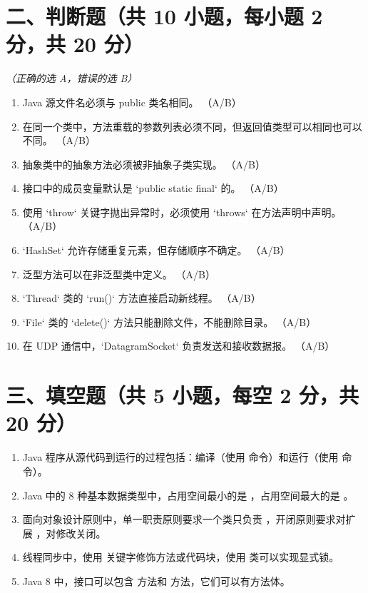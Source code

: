 \documentclass[a3paper, landscape, 11pt, twocolumn]{article}
\newcommand{\blank}{\underline{\hspace{2cm}}}
\begin{document}
\section*{二、判断题（共 10 小题，每小题 2 分，共 20 分）}
\textit{（正确的选 A，错误的选 B）}

\begin{enumerate}[label=\arabic*., itemsep=0.6em]
	\item Java 源文件名必须与 public 类名相同。 \underline{\hspace{1cm}}（A/B）
	\item 在同一个类中，方法重载的参数列表必须不同，但返回值类型可以相同也可以不同。 \underline{\hspace{1cm}}（A/B）
	\item 抽象类中的抽象方法必须被非抽象子类实现。 \underline{\hspace{1cm}}（A/B）
	\item 接口中的成员变量默认是 `public static final` 的。 \underline{\hspace{1cm}}（A/B）
	\item 使用 `throw` 关键字抛出异常时，必须使用 `throws` 在方法声明中声明。 \underline{\hspace{1cm}}（A/B）
	\item `HashSet` 允许存储重复元素，但存储顺序不确定。 \underline{\hspace{1cm}}（A/B）
	\item 泛型方法可以在非泛型类中定义。 \underline{\hspace{1cm}}（A/B）
	\item `Thread` 类的 `run()` 方法直接启动新线程。 \underline{\hspace{1cm}}（A/B）
	\item `File` 类的 `delete()` 方法只能删除文件，不能删除目录。 \underline{\hspace{1cm}}（A/B）
	\item 在 UDP 通信中，`DatagramSocket` 负责发送和接收数据报。 \underline{\hspace{1cm}}（A/B）
\end{enumerate}

\section*{三、填空题（共 5 小题，每空 2 分，共 20 分）}

\begin{enumerate}[label=\arabic*., itemsep=0.8em]
	\item Java 程序从源代码到运行的过程包括：编译（使用 \blank 命令）和运行（使用 \blank 命令）。
	\item Java 中的 8 种基本数据类型中，占用空间最小的是 \blank，占用空间最大的是 \blank。
	\item 面向对象设计原则中，单一职责原则要求一个类只负责 \blank，开闭原则要求对扩展 \blank，对修改关闭。
	\item 线程同步中，使用 \blank 关键字修饰方法或代码块，使用 \blank 类可以实现显式锁。
	\item Java 8 中，接口可以包含 \blank 方法和 \blank 方法，它们可以有方法体。
\end{enumerate}
\end{document}
